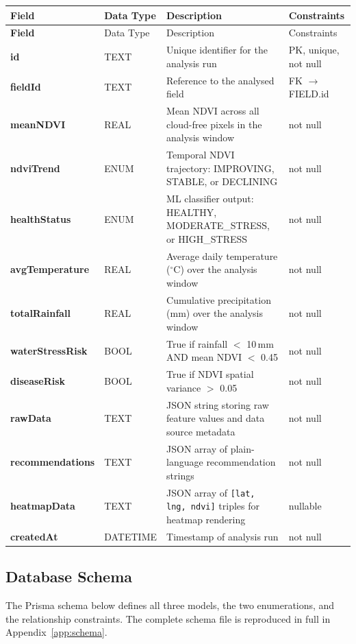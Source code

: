 \begin{longtable}{>{\bfseries}p{3.2cm} p{2.0cm} p{5.5cm} p{2.5cm}}
\toprule
Field & Data Type & Description & Constraints \\
\midrule
\endfirsthead
\toprule
Field & Data Type & Description & Constraints \\
\midrule
\endhead
\bottomrule
\endfoot
id              & TEXT     & Unique identifier for the analysis run & PK, unique, not null \\[3pt]
fieldId         & TEXT     & Reference to the analysed field & FK $\rightarrow$ FIELD.id \\[3pt]
meanNDVI        & REAL     & Mean NDVI across all cloud-free pixels in the analysis window & not null \\[3pt]
ndviTrend       & ENUM     & Temporal NDVI trajectory: IMPROVING, STABLE, or DECLINING & not null \\[3pt]
healthStatus    & ENUM     & ML classifier output: HEALTHY, MODERATE\_STRESS, or HIGH\_STRESS & not null \\[3pt]
avgTemperature  & REAL     & Average daily temperature ($^{\circ}$C) over the analysis window & not null \\[3pt]
totalRainfall   & REAL     & Cumulative precipitation (mm) over the analysis window & not null \\[3pt]
waterStressRisk & BOOL     & True if rainfall $<$ 10\,mm AND mean NDVI $<$ 0.45 & not null \\[3pt]
diseaseRisk     & BOOL     & True if NDVI spatial variance $>$ 0.05 & not null \\[3pt]
rawData         & TEXT     & JSON string storing raw feature values and data source metadata & not null \\[3pt]
recommendations & TEXT     & JSON array of plain-language recommendation strings & not null \\[3pt]
heatmapData     & TEXT     & JSON array of \texttt{[lat, lng, ndvi]} triples for heatmap rendering & nullable \\[3pt]
createdAt       & DATETIME & Timestamp of analysis run & not null \\[3pt]
\end{longtable}

\subsection{Database Schema}

The Prisma schema below defines all three models, the two enumerations, and the relationship constraints. The complete schema file is reproduced in full in Appendix~\ref{app:schema}.

